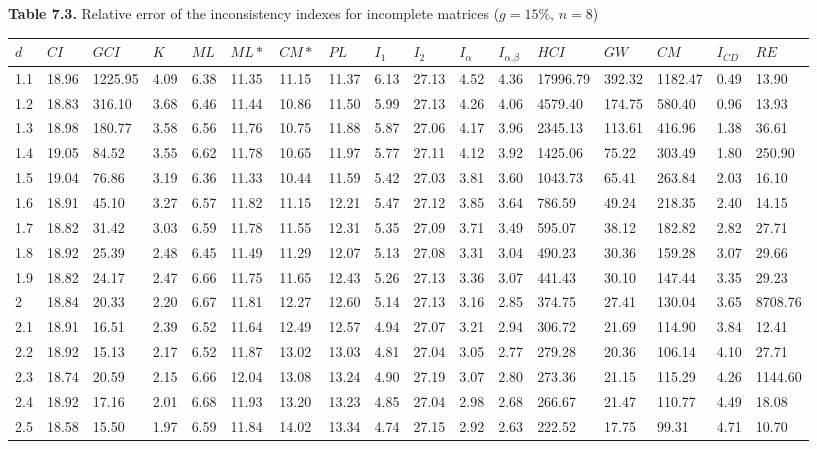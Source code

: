 \newpage
\textbf{Table 7.3.} Relative error of the inconsistency indexes for incomplete matrices ($g=15\%$, $n=8$)
\begin{adjustbox}{angle=90}
  \begin{center}
    \begin{tabular}{|l|llllllllllllllll|}
      \hline $d$ &
$CI$&$	\textit{GCI}$&$K$&$ML$&$ML*$&$CM*$&$PL$&$I_1$&$I_2$&$I_{\alpha}$&$I_{\alpha.\beta}$&$HCI$&$GW$&$CM$&$I_{CD}$&$RE$\\ \hline \hline
1.1&18.96&1225.95&4.09&6.38&11.35&11.15&11.37&6.13&27.13&4.52&4.36&17996.79&392.32&1182.47&0.49&13.90  \\ 
1.2&18.83&316.10&3.68&6.46&11.44&10.86&11.50&5.99&27.13&4.26&4.06&4579.40&174.75&580.40&0.96&13.93  \\ 
1.3&18.98&180.77&3.58&6.56&11.76&10.75&11.88&5.87&27.06&4.17&3.96&2345.13&113.61&416.96&1.38&36.61  \\ 
1.4&19.05&84.52&3.55&6.62&11.78&10.65&11.97&5.77&27.11&4.12&3.92&1425.06&75.22&303.49&1.80&250.90  \\ 
1.5&19.04&76.86&3.19&6.36&11.33&10.44&11.59&5.42&27.03&3.81&3.60&1043.73&65.41&263.84&2.03&16.10  \\ 
1.6&18.91&45.10&3.27&6.57&11.82&11.15&12.21&5.47&27.12&3.85&3.64&786.59&49.24&218.35&2.40&14.15  \\ 
1.7&18.82&31.42&3.03&6.59&11.78&11.55&12.31&5.35&27.09&3.71&3.49&595.07&38.12&182.82&2.82&27.71  \\ 
1.8&18.92&25.39&2.48&6.45&11.49&11.29&12.07&5.13&27.08&3.31&3.04&490.23&30.36&159.28&3.07&29.66  \\ 
1.9&18.82&24.17&2.47&6.66&11.75&11.65&12.43&5.26&27.13&3.36&3.07&441.43&30.10&147.44&3.35&29.23  \\ 
2 &18.84&20.33&2.20&6.67&11.81&12.27&12.60&5.14&27.13&3.16&2.85&374.75&27.41&130.04&3.65&8708.76  \\ 
2.1&18.91&16.51&2.39&6.52&11.64&12.49&12.57&4.94&27.07&3.21&2.94&306.72&21.69&114.90&3.84&12.41  \\ 
2.2&18.92&15.13&2.17&6.52&11.87&13.02&13.03&4.81&27.04&3.05&2.77&279.28&20.36&106.14&4.10&27.71  \\ 
2.3&18.74&20.59&2.15&6.66&12.04&13.08&13.24&4.90&27.19&3.07&2.80&273.36&21.15&115.29&4.26&1144.60  \\ 
2.4&18.92&17.16&2.01&6.68&11.93&13.20&13.23&4.85&27.04&2.98&2.68&266.67&21.47&110.77&4.49&18.08  \\ 
2.5&18.58&15.50&1.97&6.59&11.84&14.02&13.34&4.74&27.15&2.92&2.63&222.52&17.75&99.31&4.71&10.70  \\ 

\end{tabular}
\end{center}
\end{adjustbox}

